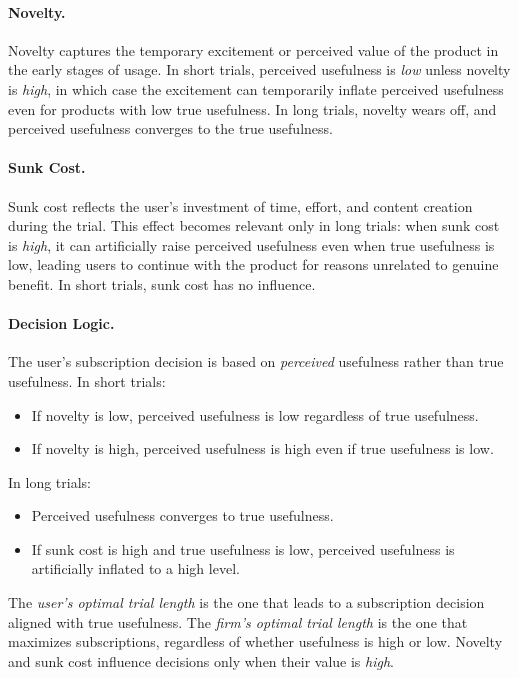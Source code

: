 \documentclass[11pt,letterpaper,english]{article}
\theoremstyle{definition}
\theoremstyle{definition}
\begin{document}
\begin{bibunit}
\paragraph{Novelty.} Novelty captures the temporary excitement or perceived value of the product in the early stages of usage. In short trials, perceived usefulness is \emph{low} unless novelty is \emph{high}, in which case the excitement can temporarily inflate perceived usefulness even for products with low true usefulness. In long trials, novelty wears off, and perceived usefulness converges to the true usefulness.

\paragraph{Sunk Cost.} Sunk cost reflects the user's investment of time, effort, and content creation during the trial. This effect becomes relevant only in long trials: when sunk cost is \emph{high}, it can artificially raise perceived usefulness even when true usefulness is low, leading users to continue with the product for reasons unrelated to genuine benefit. In short trials, sunk cost has no influence.

\paragraph{Decision Logic.} The user’s subscription decision is based on \emph{perceived} usefulness rather than true usefulness. In short trials:
\begin{itemize}
    \item If novelty is low, perceived usefulness is low regardless of true usefulness.
    \item If novelty is high, perceived usefulness is high even if true usefulness is low.
\end{itemize}
In long trials:
\begin{itemize}
    \item Perceived usefulness converges to true usefulness.
    \item If sunk cost is high and true usefulness is low, perceived usefulness is artificially inflated to a high level.
\end{itemize}
The \emph{user’s optimal trial length} is the one that leads to a subscription decision aligned with true usefulness. The \emph{firm’s optimal trial length} is the one that maximizes subscriptions, regardless of whether usefulness is high or low. Novelty and sunk cost influence decisions only when their value is \emph{high}.


\end{bibunit}
\end{document}
